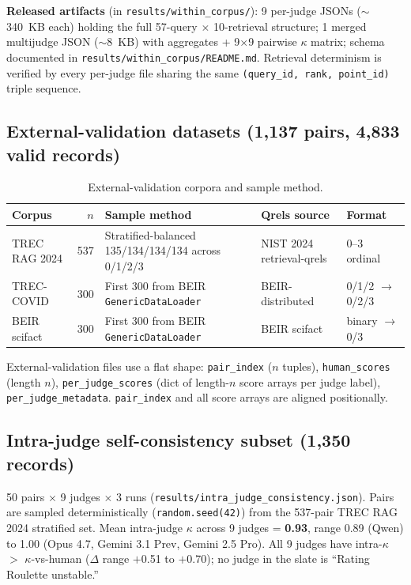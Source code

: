 \documentclass{article}
\begin{document}
\textbf{Released artifacts} (in \texttt{results/within\_corpus/}): 9 per-judge JSONs ($\sim$340~KB each) holding the full 57-query $\times$ 10-retrieval structure; 1 merged multijudge JSON ($\sim$8~KB) with aggregates + 9$\times$9 pairwise $\kappa$ matrix; schema documented in \texttt{results/within\_corpus/README.md}. Retrieval determinism is verified by every per-judge file sharing the same \texttt{(query\_id, rank, point\_id)} triple sequence.

\subsection{External-validation datasets (1{,}137 pairs, 4{,}833 valid records)}\label{sec:external}

\begin{table}[h]
\centering\small
\caption{External-validation corpora and sample method.}
\label{tab:external}
\begin{tabular}{@{}lrlll@{}}
\toprule
Corpus & $n$ & Sample method & Qrels source & Format \\
\midrule
TREC RAG 2024 & 537 & Stratified-balanced 135/134/134/134 across 0/1/2/3 & NIST 2024 retrieval-qrels & 0--3 ordinal \\
TREC-COVID & 300 & First 300 from BEIR \texttt{GenericDataLoader} & BEIR-distributed & 0/1/2 $\rightarrow$ 0/2/3 \\
BEIR scifact & 300 & First 300 from BEIR \texttt{GenericDataLoader} & BEIR scifact & binary $\rightarrow$ 0/3 \\
\bottomrule
\end{tabular}
\end{table}

External-validation files use a flat shape: \texttt{pair\_index} ($n$ tuples), \texttt{human\_scores} (length $n$), \texttt{per\_judge\_scores} (dict of length-$n$ score arrays per judge label), \texttt{per\_judge\_metadata}. \texttt{pair\_index} and all score arrays are aligned positionally.

\subsection{Intra-judge self-consistency subset (1{,}350 records)}

50 pairs $\times$ 9 judges $\times$ 3 runs (\texttt{results/intra\_judge\_consistency.json}). Pairs are sampled deterministically (\texttt{random.seed(42)}) from the 537-pair TREC RAG 2024 stratified set. Mean intra-judge $\kappa$ across 9 judges = \textbf{0.93}, range 0.89 (Qwen) to 1.00 (Opus 4.7, Gemini 3.1 Prev, Gemini 2.5 Pro). All 9 judges have intra-$\kappa$ $>$ $\kappa$-vs-human ($\Delta$ range $+$0.51 to $+$0.70); no judge in the slate is ``Rating Roulette unstable.''
\end{document}
